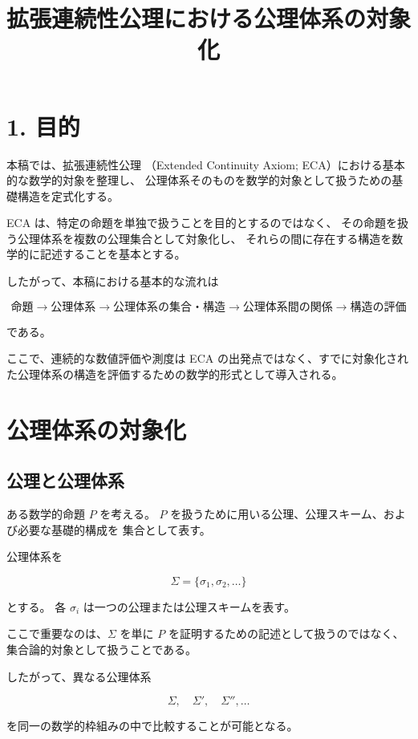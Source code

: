 \documentclass[12pt,a4paper]{article}
\title{拡張連続性公理における公理体系の対象化}
\author{}
\date{}
\begin{document}
\maketitle

\section*{1. 目的}

本稿では、拡張連続性公理
（Extended Continuity Axiom; ECA）における基本的な数学的対象を整理し、
公理体系そのものを数学的対象として扱うための基礎構造を定式化する。

ECA は、特定の命題を単独で扱うことを目的とするのではなく、
その命題を扱う公理体系を複数の公理集合として対象化し、
それらの間に存在する構造を数学的に記述することを基本とする。

したがって、本稿における基本的な流れは

\[
\text{命題}
\longrightarrow
\text{公理体系}
\longrightarrow
\text{公理体系の集合・構造}
\longrightarrow
\text{公理体系間の関係}
\longrightarrow
\text{構造の評価}
\]

である。

ここで、連続的な数値評価や測度は ECA の出発点ではなく、すでに対象化された公理体系の構造を評価するための数学的形式として導入される。

\section{公理体系の対象化}

\subsection{公理と公理体系}

ある数学的命題 $P$ を考える。
$P$ を扱うために用いる公理、公理スキーム、および必要な基礎的構成を
集合として表す。

公理体系を

\[
\Sigma=\{\sigma_1,\sigma_2,\ldots\}
\]

とする。
各 $\sigma_i$ は一つの公理または公理スキームを表す。

ここで重要なのは、$\Sigma$ を単に $P$ を証明するための記述として扱うのではなく、
集合論的対象として扱うことである。

したがって、異なる公理体系

\[
\Sigma,\quad \Sigma',\quad \Sigma'',\ldots
\]

を同一の数学的枠組みの中で比較することが可能となる。
\end{document}
